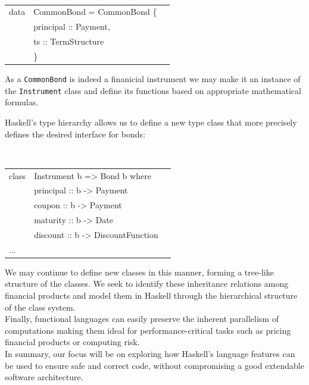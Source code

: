 \documentclass[11pt]{article}
\begin{document}
\begin{center}
\tt
\begin{tabular}{lll}
data & CommonBond = CommonBond \{\\
      &\hspace{-1cm} principal :: Payment,\\
      &\hspace{-1cm} ts :: TermStructure\\
      &\hspace{-1cm}\}
\end{tabular}
\end{center}

As a {\tt CommonBond} is indeed a finanicial instrument we may make it an instance of
the {\tt Instrument} class and define its functions based on appropriate mathematical
formulas.

Haskell's type hierarchy allows us to define a new type class that more precisely
defines the desired interface for bonds:

\begin{center}
\tt
\begin{tabular}{lll}
class & Instrument b => Bond b where\\
      &\hspace{-1cm} principal :: b -> Payment\\
      &\hspace{-1cm} coupon    :: b -> Payment\\
      &\hspace{-1cm} maturity  :: b -> Date\\
      &\hspace{-1cm} discount  :: b -> DiscountFunction\\
      ...
\end{tabular}
\end{center}

We may continue to define new classes in this manner, forming a tree-like
structure of the classes. We seek to identify these inheritance relations among
financial products and model them in Haskell through the hierarchical structure
of the class system.\\

Finally, functional languages can easily preserve the inherent parallelism of computations 
making them ideal for performance-critical tasks such as pricing financial products or
computing risk.\\

In summary, our focus will be on exploring how Haskell's language features can be used
to ensure safe and correct code, without compromising a good extendable software architecture.
\end{document}
